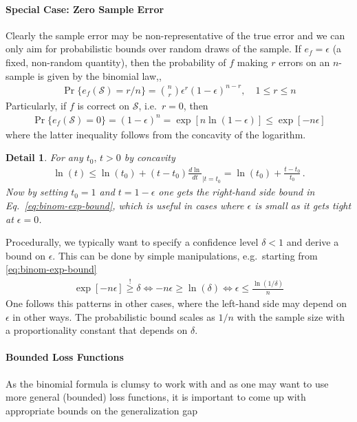 \documentclass[12pt,a4paper]{article}
\newcommand{\mc}{\mathcal}
\newtheorem{detail}{Detail}
\begin{document}
\paragraph{Special Case: Zero Sample Error}
Clearly the sample error may be non-representative of the true error and we can only aim for probabilistic bounds over random draws of the sample. If  $e_f = \epsilon$ (a fixed, non-random quantity), then the probability of $f$ making $r$ errors on an $n$-sample is given by the binomial law,,
\begin{align}
\Pr\{e_f(\mc S) = r/n\} = \binom{n}{r} \epsilon^{r} (1-\epsilon)^{n-r}, \quad 1 \le r \le n
\end{align}
Particularly, if $f$ is correct on $\mc S$, i.e.~$r=0$, then  
\begin{align}
\label{eq:binom-exp-bound}
\Pr\{e_f(\mc S) = 0\} =  (1-\epsilon)^{n} = \exp[n\ln(1-\epsilon)] \le \exp[-n \epsilon]
\end{align}
where the latter inequality follows from the concavity of the logarithm. 
%
\begin{detail}
For any $t_0, \, t>0$ by concavity 
\begin{align*}
\ln(t) \le \ln(t_0) + (t-t_0) \frac{d \ln}{dt}_{\Big| t=t_0} = \ln (t_0) + \frac{t-t_0}{t_0}\,.
\end{align*}
Now by setting $t_0=1$ and $t=1-\epsilon$ one gets the right-hand side bound in Eq.~\eqref{eq:binom-exp-bound}, which is useful in cases where $\epsilon$ is small as it gets tight at $\epsilon=0$.
\end{detail}
%
\noindent  Procedurally, we typically want to specify a confidence level $\delta<1$ and derive a bound on $\epsilon$. This can be done by simple manipulations, e.g.~starting from \eqref{eq:binom-exp-bound}
\begin{align}
\exp[-n\epsilon] \stackrel !\ge\delta \iff -n \epsilon \ge \ln(\delta) \iff \epsilon \le \frac{\ln(1/\delta)}{n} 
\end{align}
One follows this patterns in other cases, where the left-hand side may depend on $\epsilon$ in other ways. The probabilistic bound scales as $1/n$ with the sample size with a proportionality constant that depends on $\delta$. 

\paragraph*{Bounded Loss Functions}

As the binomial formula is clumsy to work with and as one may want to use more general (bounded) loss functions, it is important to come up with appropriate bounds on the generalization gap 



\newpage



\end{document}

